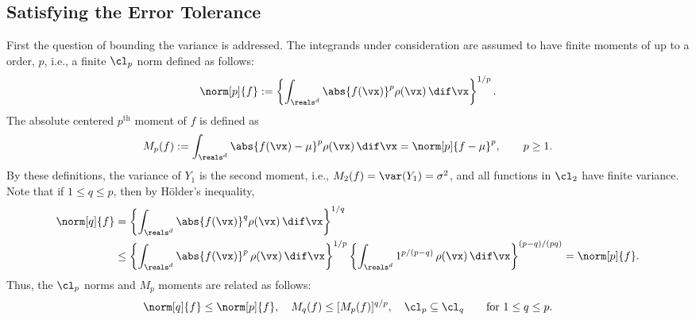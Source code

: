 \documentclass[graybox]{svmult}
\begin{document}
\subsection{Satisfying the Error Tolerance} First the question of bounding the variance is addressed.  The integrands under consideration are assumed to have finite moments of up to a order, $p$, i.e., a finite $\cl_{p}$ norm defined as follows:
\[
\norm[p]{f} :=\left\{\int_{\reals^d} \abs{f(\vx)}^p \rho(\vx) \, \dif \vx\right\}^{1/p}.
\]
The absolute centered $p^{\text{th}}$ moment of $f$ is defined as
\begin{equation} \label{momentdef}
M_p(f) := \int_{\reals^d} \abs{f(\vx)-\mu}^p \rho(\vx) \, \dif \vx = \norm[p]{f - \mu}^p, \qquad p \ge 1.
\end{equation}
By these definitions, the variance of $Y_1$ is the second moment, i.e., $M_2(f) = \var(Y_1)=\sigma^2$, and all functions in $\cl_2$ have finite variance.  Note that if $1 \le q \le p$, then by H\"older's inequality,
\begin{align*}\label{LP}
\norm[q]{f} &=\left\{\int_{\reals^d} \abs{f(\vx)}^q \rho(\vx) \, \dif \vx\right\}^{1/q}\\
\nonumber & \le \left\{\int_{\reals^d} \abs{f(\vx)}^p \, \rho(\vx) \, \dif \vx \right\}^{1/p} \left\{\int_{\reals^d} 1^{p/(p-q)} \, \rho(\vx) \, \dif \vx\right\}^{(p-q)/(pq)} = \norm[p]{f}.
\end{align*}
Thus, the $\cl_p$ norms and $M_p$ moments are related as follows:  
\begin{equation} \label{clinclude}
\norm[q]{f} \le \norm[p]{f}, \quad M_q(f) \le [M_p(f)]^{q/p}, \quad \cl_p \subseteq \cl_q \qquad \text{for } 1 \le q \le p .
\end{equation}
\end{document}

